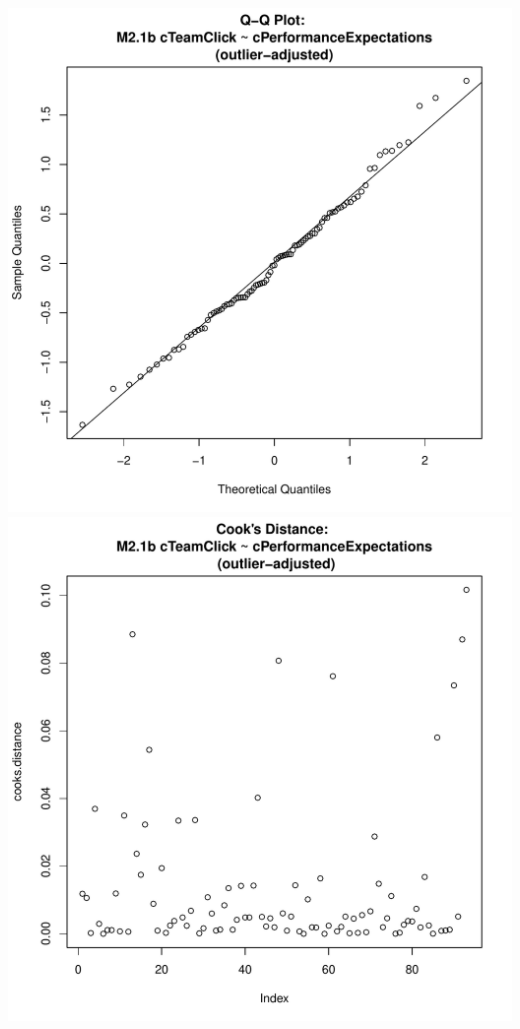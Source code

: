 \documentclass[12pt]{report}
\begin{document}
\includegraphics[scale =.4]{../images/MLM21bOutQQNorm.pdf}
\includegraphics[scale =.4]{../images/MLM21bOutCooksD.pdf}

\newpage

\end{document}
